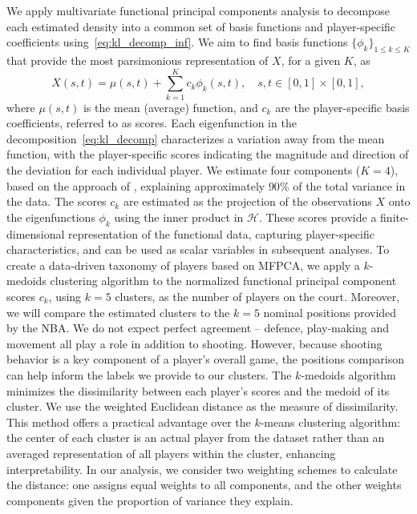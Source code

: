 \documentclass[USenglish]{article}
\theoremstyle{dgthm}
\theoremstyle{dgdef}
\begin{document}
We apply multivariate functional principal components analysis  \citep{happMultivariateFunctionalPrincipal2018} to decompose each estimated density into a common set of basis functions and player-specific coefficients using~\eqref{eq:kl_decomp_inf}.
We aim to find basis functions $\{\phi_k\}_{1 \leq k \leq K}$ that provide the most parsimonious representation of $X$, for a given $K$, as
\begin{equation}\label{eq:kl_decomp}
	X(s, t) = \mu(s, t) + \sum_{k = 1}^K c_k\phi_k(s, t), \quad s, t \in [0, 1] \times [0, 1],
\end{equation}
where $\mu(s, t)$ is the mean (average) function, and $c_k$ are the player-specific basis coefficients, referred to as scores. Each eigenfunction in the decomposition~\eqref{eq:kl_decomp} characterizes a variation away from the mean function, with the player-specific scores indicating the magnitude and direction of the deviation for each individual player. We estimate four components ($K = 4$), based on the approach of \cite{golovkineUseGramMatrix2024}, explaining approximately $90\%$ of the total variance in the data. The scores $c_k$ are estimated as the projection of the observations $X$ onto the eigenfunctions $\phi_k$ using the inner product in $\mathcal{H}$. These scores provide a finite-dimensional representation of the functional data, capturing player-specific characteristics, and can be used as scalar variables in subsequent analyses.
To create a data-driven taxonomy of players based on MFPCA, we apply a $k$-medoids clustering algorithm \citep{kaufmanFindingGroupsData2009} to the normalized functional principal component scores $c_k$, using $k = 5$ clusters, as the number of players on the court.
	Moreover, we will compare the estimated clusters to the $k=5$ nominal positions provided by the NBA.
		We do not expect perfect agreement -- defence, play-making and movement all play a role in addition to shooting.
		However, because shooting behavior is a key component of a player's overall game, the positions comparison can help inform the labels we provide to our clusters.
The $k$-medoids algorithm minimizes the dissimilarity between each player's scores and the medoid of its cluster. We use the weighted Euclidean distance as the measure of dissimilarity. This method offers a practical advantage over the $k$-means clustering algorithm: the center of each cluster is an actual player from the dataset rather than an averaged representation of all players within the cluster, enhancing interpretability. In our analysis, we consider two weighting schemes to calculate the distance: one assigns equal weights to all components, and the other weights components given the proportion of variance they explain.
\end{document}
